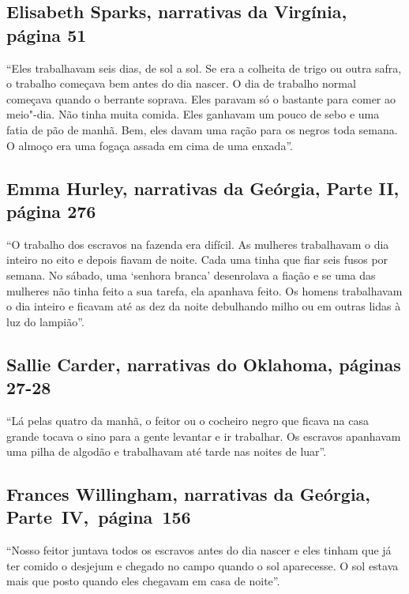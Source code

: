 \subsection{Elisabeth Sparks, narrativas da Virgínia, página 51}
\label{ref249} 

``Eles trabalhavam seis dias, de sol a sol. Se era a colheita de trigo ou
outra safra, o trabalho começava bem antes do dia nascer. O dia de
trabalho normal começava quando o berrante soprava. Eles paravam só o
bastante para comer ao meio"-dia. Não tinha muita comida. Eles ganhavam
um pouco de sebo e uma fatia de pão de manhã. Bem, eles davam uma ração
para os negros toda semana. O almoço era uma fogaça assada em cima de
uma enxada''.

\subsection{Emma Hurley, narrativas da Geórgia, Parte II, página 276}
\label{ref157}

``O trabalho dos escravos na fazenda era difícil. As mulheres
trabalhavam o dia inteiro no eito e depois fiavam de noite. Cada uma
tinha que fiar seis fusos por semana. No sábado, uma `senhora branca'
desenrolava a fiação e se uma das mulheres não tinha feito a sua tarefa,
ela apanhava feito. Os homens trabalhavam o dia inteiro e ficavam até as %
dez da noite debulhando milho ou em outras lidas à luz do lampião''.

\subsection{Sallie Carder, narrativas do Oklahoma, páginas 27-28} \label{ref47}

``Lá pelas quatro da manhã, o feitor ou o cocheiro negro que ficava na
casa grande tocava o sino para a gente levantar e ir trabalhar. Os
escravos apanhavam uma pilha de algodão e trabalhavam até tarde nas
noites de luar''.

\subsection{Frances Willingham, narrativas da Geórgia, Parte~IV,~página~156}
\label{ref295}

``Nosso feitor juntava todos os escravos antes do dia nascer e eles
tinham que já ter comido o desjejum e chegado no campo quando o sol
aparecesse. O sol estava mais que posto quando eles chegavam em casa de
noite''.

